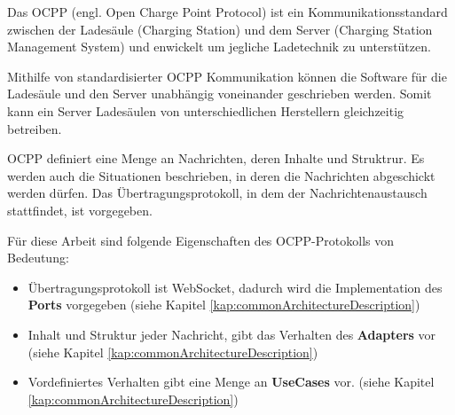 Das OCPP (engl. Open Charge Point Protocol) ist ein Kommunikationsstandard zwischen der Ladesäule (Charging Station) und dem Server (Charging Station Management System)
und enwickelt um jegliche Ladetechnik zu unterstützen.\cite[Part 0, 3. Seite]{ocppDocs}

Mithilfe von standardisierter OCPP Kommunikation können die Software für die Ladesäule und den Server unabhängig voneinander geschrieben werden.
Somit kann ein Server Ladesäulen von unterschiedlichen Herstellern gleichzeitig betreiben.

OCPP definiert eine Menge an Nachrichten, deren Inhalte und Struktrur. 
Es werden auch die Situationen beschrieben, in deren die Nachrichten abgeschickt werden dürfen.
Das Übertragungsprotokoll, in dem der Nachrichtenaustausch stattfindet, ist vorgegeben.

Für diese Arbeit sind folgende Eigenschaften des OCPP-Protokolls von Bedeutung:
\begin{itemize}
    \item Übertragungsprotokoll ist WebSocket, dadurch wird die Implementation des \textbf{Ports} vorgegeben (siehe Kapitel \ref{kap:commonArchitectureDescription})
    \item Inhalt und Struktur jeder Nachricht, gibt das Verhalten des \textbf{Adapters} vor (siehe Kapitel \ref{kap:commonArchitectureDescription})
    \item Vordefiniertes Verhalten gibt eine Menge an \textbf{UseCases} vor. (siehe Kapitel \ref{kap:commonArchitectureDescription})
\end{itemize}